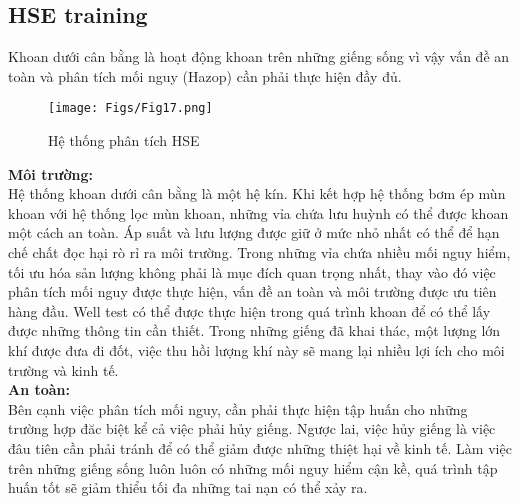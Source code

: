 \documentclass[12pt,a4paper]{article}
\begin{document}
\subsection{HSE training}
	Khoan dưới cân bằng là hoạt động khoan trên những giếng sống vì vậy vấn đề an toàn và phân tích mối nguy (Hazop)\cite{knight2004hse} cần phải thực hiện đầy đủ.
	\begin{figure}[h]
		\centering
		\texttt{[image: Figs/Fig17.png]}
		\caption{Hệ thống phân tích HSE\cite{HSE}}
	\end{figure}\newline
	\textbf{Môi trường:}\\
	Hệ thống khoan dưới cân bằng là một hệ kín. Khi kết hợp hệ thống bơm ép mùn khoan với hệ thống lọc mùn khoan, những vỉa chứa lưu huỳnh có thể được khoan một cách an toàn. Áp suất và lưu lượng được giữ ở mức nhỏ nhất có thể để hạn chế chất đọc hại rò rỉ ra môi trường. Trong những vỉa chứa nhiều mối nguy hiểm, tối ưu hóa sản lượng không phải là mục đích quan trọng nhất, thay vào đó việc phân tích mối nguy được thực hiện, vấn đề an toàn và môi trường được ưu tiên hàng đầu. Well test có thể được thực hiện trong quá trình khoan để có thể lấy được những thông tin cần thiết. Trong những giếng đã khai thác, một lượng lớn khí được đưa đi đốt, việc thu hồi lượng khí này sẽ mang lại nhiều lợi ích cho môi trường và kinh tế.\\
	\newpage
	\textbf{An toàn:}\\
	Bên cạnh việc phân tích mối nguy, cần phải thực hiện tập huấn cho những trường hợp đăc biệt kể cả việc phải hủy giếng. Ngược lai, việc hủy giếng là việc đâu tiên cần phải tránh để có thể giảm được những thiệt hại về kinh tế. Làm việc trên những giếng sống luôn luôn có những mối nguy hiểm cận kề, quá trình tập huấn tốt sẽ giảm thiểu tối đa những tai nạn có thể xảy ra.
\end{document}
